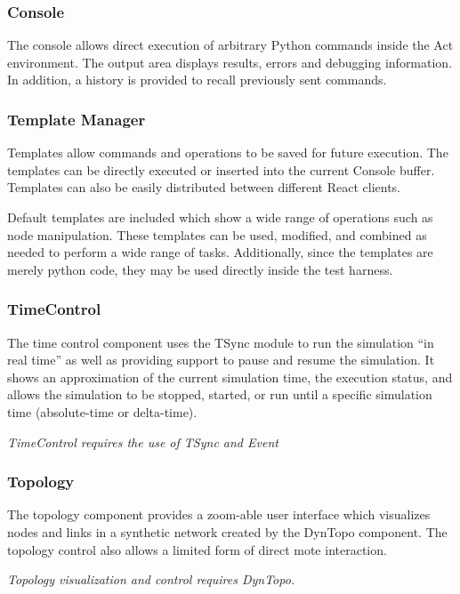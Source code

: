 \subsubsection{Console}

The console allows direct execution of arbitrary Python commands
inside the Act environment. The output area displays results, errors
and debugging information. In addition, a history is provided to
recall previously sent commands.


\subsubsection{Template Manager}

Templates allow commands and operations to be saved for future
execution.  The templates can be directly executed or inserted into
the current Console buffer.  Templates can also be easily distributed
between different React clients.

Default templates are included which show a wide range of operations
such as node manipulation.  These templates can be used, modified, and
combined as needed to perform a wide range of tasks.  Additionally,
since the templates are merely python code, they may be used directly
inside the test harness.


\subsubsection{TimeControl}

The time control component uses the TSync module to run the simulation
``in real time'' as well as providing support to pause and resume the
simulation. It shows an approximation of the current simulation time,
the execution status, and allows the simulation to be stopped,
started, or run until a specific simulation time (absolute-time or
delta-time).

{\em TimeControl requires the use of TSync and Event}


\subsubsection{Topology}

The topology component provides a zoom-able user interface which
visualizes nodes and links in a synthetic network created by the
DynTopo component. The topology control also allows a limited form of
direct mote interaction.

{\em Topology visualization and control requires DynTopo.}


